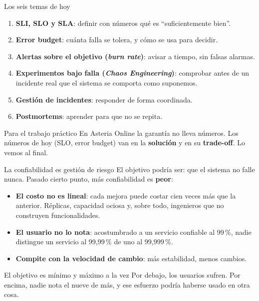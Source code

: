 \documentclass[institutional,screen,none]{ua-engineering-v6-beamer}
\begin{document}
\begin{frame}{Los seis temas de hoy}
\begin{enumerate}
\item \textbf{SLI, SLO y SLA}: definir con números qué es ``suficientemente bien''.
\item \textbf{Error budget}: cuánta falla se tolera, y cómo se usa para decidir.
\item \textbf{Alertas sobre el objetivo (\emph{burn rate})}: avisar a tiempo, sin falsas alarmas.
\item \textbf{Experimentos bajo falla (\emph{Chaos Engineering})}: comprobar antes de un incidente real que el sistema se comporta como suponemos.
\item \textbf{Gestión de incidentes}: responder de forma coordinada.
\item \textbf{Postmortems}: aprender para que no se repita.
\end{enumerate}

\pause

\begin{alertblock}{Para el trabajo práctico}
En Asteria Online la garantía no lleva números. Los números de hoy (SLO, error budget) van en la \textbf{solución} y en su \textbf{trade-off}. Lo vemos al final.
\end{alertblock}
\end{frame}

\begin{frame}{La confiabilidad es gestión de riesgo}
El objetivo podría ser: que el sistema no falle nunca. \pause Pasado cierto punto, más confiabilidad es \textbf{peor}:
\begin{itemize}
\item \textbf{El costo no es lineal}: cada mejora puede costar cien veces más que la anterior. Réplicas, capacidad ociosa y, sobre todo, ingenieros que no construyen funcionalidades.
\item \textbf{El usuario no lo nota}: acostumbrado a un servicio confiable al 99\,\%, nadie distingue un servicio al 99,99\,\% de uno al 99,999\,\%.
\item \textbf{Compite con la velocidad de cambio}: más estabilidad, menos cambios.
\end{itemize}

\pause

\begin{block}{El objetivo es mínimo y máximo a la vez}
Por debajo, los usuarios sufren. Por encima, nadie nota el nueve de más, y ese esfuerzo podría haberse usado en otra cosa.
\end{block}
\end{frame}
\end{document}
